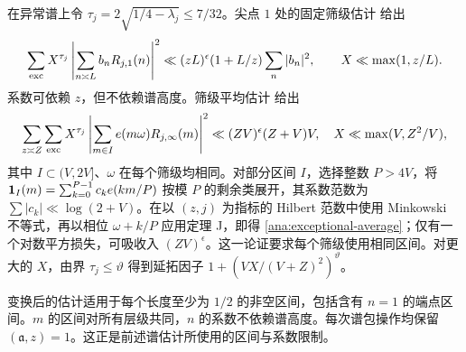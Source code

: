 在异常谱上令 $\tau_j=2\sqrt{1/4-\lambda_j}\le7/32$。尖点 $1$ 处的固定筛级估计 \cite[Theorem A]{Pascadi} 给出
\begin{equation}
 \sum_{\rm exc}X^{\tau_j}
       \left|\sum_{n\asymp L}b_nR_{j,1}(n)\right|^2
 \ll(zL)^\epsilon(1+L/z)\sum_n|b_n|^2,
 \qquad X\ll\max(1,z/L).
 \label{ana:exceptional-fixed}
\end{equation}
系数可依赖 $z$，但不依赖谱高度。筛级平均估计 \cite[Theorem J]{Pascadi} 给出
\begin{equation}
 \sum_{z\asymp Z}\sum_{\rm exc}X^{\tau_j}
       \left|\sum_{m\in I}e(m\omega)R_{j,\infty}(m)\right|^2
 \ll(ZV)^\epsilon(Z+V)V,
 \quad X\ll\max(V,Z^2/V),
 \label{ana:exceptional-average}
\end{equation}
其中 $I\subset(V,2V]$、$\omega$ 在每个筛级均相同。对部分区间 $I$，选择整数 $P>4V$，将 $\mathbf 1_I(m)=\sum_{k=0}^{P-1}c_ke(km/P)$ 按模 $P$ 的剩余类展开，其系数范数为 $\sum|c_k|\ll\log(2+V)$。在以 $(z,j)$ 为指标的 Hilbert 范数中使用 Minkowski 不等式，再以相位 $\omega+k/P$ 应用定理 J，即得 \eqref{ana:exceptional-average}；仅有一个对数平方损失，可吸收入 $(ZV)^\epsilon$。这一论证要求每个筛级使用相同区间。对更大的 $X$，由界 $\tau_j\le\vartheta$ 得到延拓因子 $1+(VX/(V+Z)^2)^\vartheta$。

变换后的估计适用于每个长度至少为 $1/2$ 的非空区间，包括含有 $n=1$ 的端点区间。$m$ 的区间对所有层级共同，$n$ 的系数不依赖谱高度。每次谱包操作均保留 $(\mathfrak a,z)=1$。这正是前述谱估计所使用的区间与系数限制。